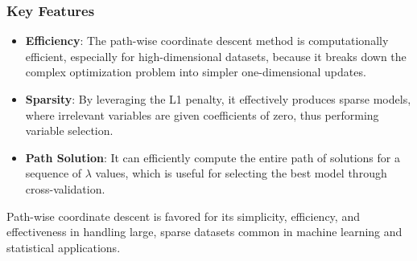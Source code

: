 \documentclass[
]{article}
\providecommand{\tightlist}{%
  \setlength{\itemsep}{0pt}\setlength{\parskip}{0pt}}
\begin{document}
\hypertarget{key-features}{%
\subsubsection{Key Features}\label{key-features}}

\begin{itemize}
\tightlist
\item
  \textbf{Efficiency}: The path-wise coordinate descent method is
  computationally efficient, especially for high-dimensional datasets,
  because it breaks down the complex optimization problem into simpler
  one-dimensional updates.
\item
  \textbf{Sparsity}: By leveraging the L1 penalty, it effectively
  produces sparse models, where irrelevant variables are given
  coefficients of zero, thus performing variable selection.
\item
  \textbf{Path Solution}: It can efficiently compute the entire path of
  solutions for a sequence of \(\lambda\) values, which is useful for
  selecting the best model through cross-validation.
\end{itemize}

Path-wise coordinate descent is favored for its simplicity, efficiency,
and effectiveness in handling large, sparse datasets common in machine
learning and statistical applications.
\end{document}

